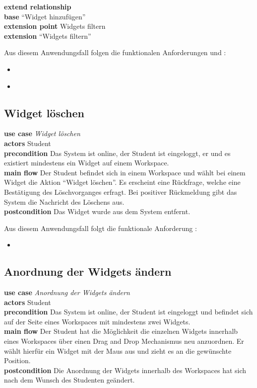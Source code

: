 \textbf{extend relationship}\\
\textbf{base} "`Widget hinzufügen"'\\
\textbf{extension point} Widgets filtern\\
\textbf{extension} "`Widgets filtern"'
 
Aus diesem Anwendungsfall folgen die funktionalen Anforderungen  und :
\begin{itemize}
 \item \requirement{\requirementWidgetFilterName}\label{requirementWidgetFilterName}
 \item \requirement{\requirementWidgetFilterOnline}\label{requirementWidgetFilterOnline}
\end{itemize}
 
\subsection{Widget löschen}
\textbf{use case} \emph{Widget löschen}\\
\textbf{actors} Student\\
\textbf{precondition} Das System ist online, der Student ist eingeloggt, er und es existiert mindestens ein Widget auf einem Workspace.\\
\textbf{main flow} Der Student befindet sich in einem Workspace und wählt bei einem Widget die Aktion "`Widget löschen"'. Es erscheint eine Rückfrage, welche eine Bestätigung des Löschvorganges erfragt. Bei positiver Rückmeldung gibt das System die Nachricht des Löschens aus.\\
\textbf{postcondition} Das Widget wurde aus dem System entfernt.
 
Aus diesem Anwendungsfall folgt die funktionale Anforderung :
\begin{itemize}
 \item \requirement{\requirementWidgetDelete}\label{requirementWidgetDelete}
\end{itemize}
 
\subsection{Anordnung der Widgets ändern}
\textbf{use case} \emph{Anordnung der Widgets ändern}\\
\textbf{actors} Student\\
\textbf{precondition} Das System ist online, der Student ist eingeloggt und befindet sich auf der Seite eines Workspaces mit mindestens zwei Widgets.\\
\textbf{main flow} Der Student hat die Möglichkeit die einzelnen Widgets innerhalb eines Workspaces über einen Drag and Drop Mechanismus neu anzuordnen. Er wählt hierfür ein Widget mit der Maus aus und zieht es an die gewünschte Position.\\
\textbf{postcondition} Die Anordnung der Widgets innerhalb des Workspaces hat sich nach dem Wunsch des Studenten geändert.
 
